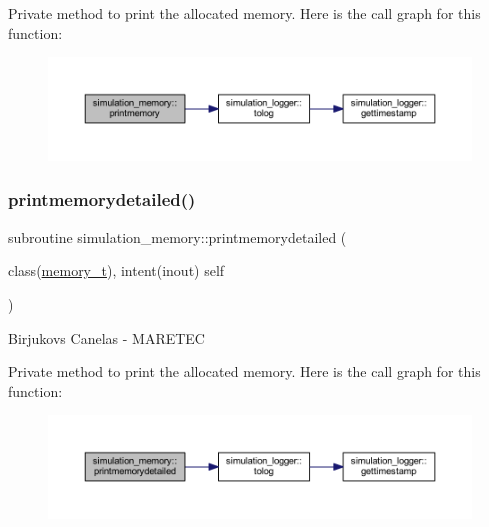 Private method to print the allocated memory. Here is the call graph for this function\+:\nopagebreak
\begin{figure}[H]
\begin{center}
\leavevmode
\includegraphics[width=350pt]{namespacesimulation__memory_a5827bef8479b809a453af147ceaa8c7c_cgraph}
\end{center}
\end{figure}
\mbox{\label{namespacesimulation__memory_af2a472000acc1ff59cb6e63679617699}} 
\subsubsection{\texorpdfstring{printmemorydetailed()}{printmemorydetailed()}}
{\footnotesize\ttfamily subroutine simulation\+\_\+memory\+::printmemorydetailed (\begin{DoxyParamCaption}\item[{class(\mbox{\hyperlink{structsimulation__memory_1_1memory__t}{memory\+\_\+t}}), intent(inout)}]{self }\end{DoxyParamCaption})\hspace{0.3cm}{\ttfamily [private]}}



Birjukovs Canelas -\/ M\+A\+R\+E\+T\+EC 

Private method to print the allocated memory. Here is the call graph for this function\+:
\nopagebreak
\begin{figure}[H]
\begin{center}
\leavevmode
\includegraphics[width=350pt]{namespacesimulation__memory_af2a472000acc1ff59cb6e63679617699_cgraph}
\end{center}
\end{figure}


